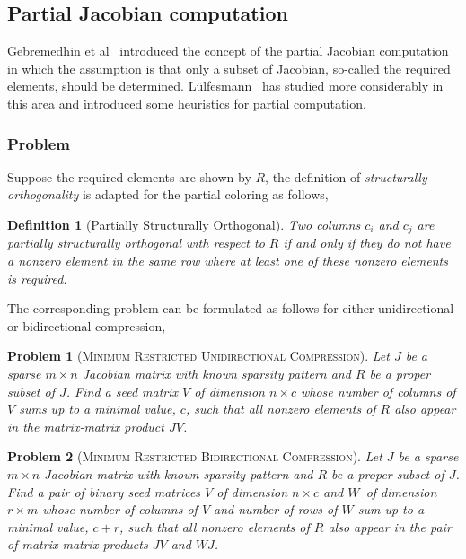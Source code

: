 \documentclass[12pt, twoside,a4paper,toc=bibliography]{scrbook}
\newtheorem{problem}{Problem}
\newtheorem{definition}{Definition}
\newcommand{\col}{\ensuremath{c}}
\newcommand{\row}{\ensuremath{r}}
\newcommand{\MinStaBic}{\textsc{Minimum Star Bicoloring}}
\newcommand{\MinBidCom}{\textsc{Minimum Bidirectional Compression}}
\newcommand{\MinRUniCom}{\textsc{Minimum Restricted Unidirectional Compression}}
\newcommand{\MinRBidCom}{\textsc{Minimum Restricted Bidirectional Compression}}
\begin{document}
\subsection{Partial Jacobian computation}
\label{s.part.jac}
Gebremedhin et al~\cite{Gebremedhin05whatcolor} introduced the concept of the partial Jacobian computation
in which the assumption is that only a subset of Jacobian, so-called the required elements,
should be determined.
L{\"u}lfesmann~\cite{Lulfesmann2012Fap} has studied more considerably in this area and
introduced some heuristics for partial computation.
\subsubsection{Problem}
\label{ss.problem.part}
Suppose the required elements are shown by $R$, the definition of
\emph{structurally orthogonality} is adapted for the partial coloring as follows,
\begin{definition}[Partially Structurally Orthogonal]\label{d.part.str.orth}
Two columns $c_i$ and $c_j$ are partially structurally orthogonal with respect to $R$
if and only if they do not have a nonzero element in the same row where at least
one of these nonzero elements is required.
\end{definition}

The corresponding problem can be formulated as follows for either unidirectional
or bidirectional compression,
\begin{problem}[\MinRUniCom]
\label{p.seed.runi} Let $J$ be a sparse ${m\times n}$ Jacobian matrix with known sparsity
pattern and $R$ be a proper subset of $J$. Find a seed matrix $V$ of dimension $n\times \col$
whose number of columns of $V$ sums up
to a minimal value, $\col$, such that all nonzero elements of $R$ also appear in
the matrix-matrix product $JV$.
\end{problem}

\begin{problem}[\MinRBidCom]
\label{p.seed.rbid} Let $J$ be a sparse ${m\times n}$ Jacobian matrix with known sparsity
pattern and $R$ be a proper subset of $J$.
Find a pair of binary seed matrices $V$ of dimension $n\times \col$ and $W$~of
dimension $\row \times m$ whose number of columns of $V$ and number of rows of $W$ sum up
to a minimal value, $\col + \row$, such that all nonzero elements of $R$ also appear in
the pair of matrix-matrix products $JV$ and $WJ$.
\end{problem}
\end{document}
